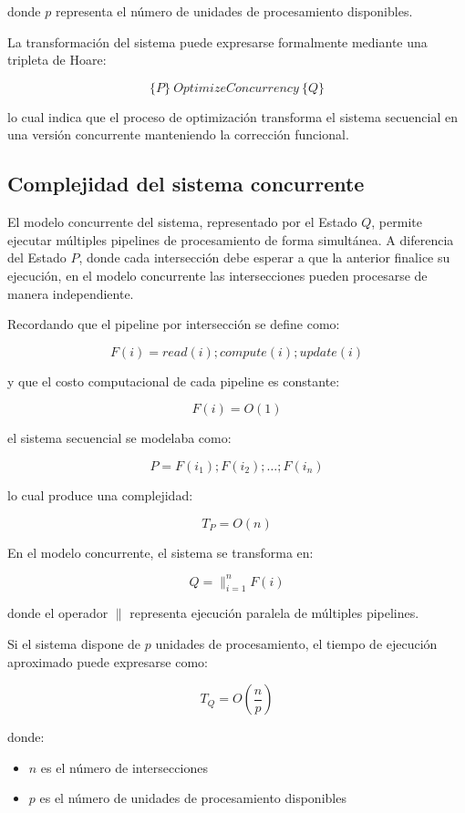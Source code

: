 \documentclass[12pt]{article}
\begin{document}
donde \(p\) representa el número de unidades de procesamiento disponibles.

La transformación del sistema puede expresarse formalmente mediante una tripleta de Hoare:

\[
\{P\} \ OptimizeConcurrency \ \{Q\}
\]

lo cual indica que el proceso de optimización transforma el sistema secuencial en una versión concurrente manteniendo la corrección funcional.

\subsection{Complejidad del sistema concurrente}

El modelo concurrente del sistema, representado por el Estado \(Q\), permite ejecutar múltiples pipelines de procesamiento de forma simultánea. A diferencia del Estado \(P\), donde cada intersección debe esperar a que la anterior finalice su ejecución, en el modelo concurrente las intersecciones pueden procesarse de manera independiente.

Recordando que el pipeline por intersección se define como:

\[
F(i) = read(i); compute(i); update(i)
\]

y que el costo computacional de cada pipeline es constante:

\[
F(i) = O(1)
\]

el sistema secuencial se modelaba como:

\[
P = F(i_1); F(i_2); \dots ; F(i_n)
\]

lo cual produce una complejidad:

\[
T_P = O(n)
\]

En el modelo concurrente, el sistema se transforma en:

\[
Q = \parallel_{i=1}^{n} F(i)
\]

donde el operador \(\parallel\) representa ejecución paralela de múltiples pipelines.

Si el sistema dispone de \(p\) unidades de procesamiento, el tiempo de ejecución aproximado puede expresarse como:

\[
T_Q = O\left(\frac{n}{p}\right)
\]

donde:

\begin{itemize}
\item \(n\) es el número de intersecciones
\item \(p\) es el número de unidades de procesamiento disponibles
\end{itemize}
\end{document}

